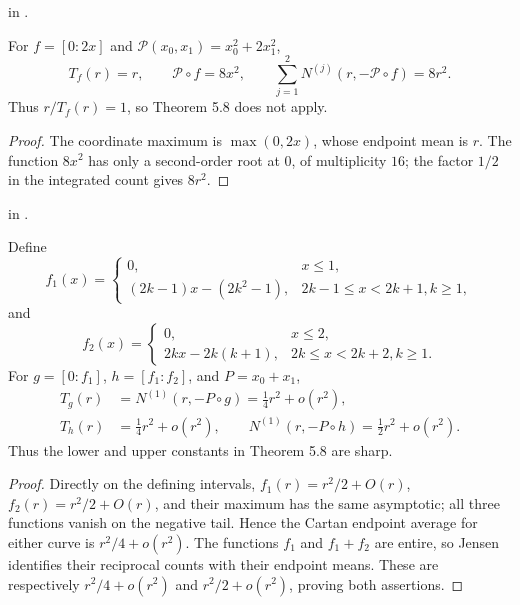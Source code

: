 \begin{leanproof}
 in .
\end{leanproof}

\begin{example}
\leanok
{}
For $f=[0:2x]$ and $\mathcal P(x_0,x_1)=x_0^2+2x_1^2$,
\[
 T_f(r)=r,\qquad \mathcal P\circ f=8x^2,\qquad
 \sum_{j=1}^2N^{(j)}(r,-\mathcal P\circ f)=8r^2.
\]
Thus $r/T_f(r)=1$, so Theorem 5.8 does not apply.
\end{example}

\begin{proof}
\leanok
The coordinate maximum is $\max(0,2x)$, whose endpoint mean is $r$.  The
function $8x^2$ has only a second-order root at $0$, of multiplicity $16$;
the factor $1/2$ in the integrated count gives $8r^2$.
\end{proof}

\begin{leanproof}
 in
.
\end{leanproof}

\begin{example}
\leanok
{}
Define
\[
 f_1(x)=\begin{cases}0,&x\leq1,\\
 (2k-1)x-(2k^2-1),&2k-1\leq x<2k+1, k\geq1,
 \end{cases}
\]
and
\[
 f_2(x)=\begin{cases}0,&x\leq2,\\
 2kx-2k(k+1),&2k\leq x<2k+2, k\geq1.
 \end{cases}
\]
For $g=[0:f_1]$, $h=[f_1:f_2]$, and $P=x_0+x_1$,
\begin{align*}
 T_g(r)&=N^{(1)}(r,-P\circ g)=\frac14r^2+o(r^2),\\
 T_h(r)&=\frac14r^2+o(r^2),\qquad
 N^{(1)}(r,-P\circ h)=\frac12r^2+o(r^2).
\end{align*}
Thus the lower and upper constants in Theorem 5.8 are sharp.
\end{example}

\begin{proof}
\leanok
Directly on the defining intervals,
$f_1(r)=r^2/2+O(r)$, $f_2(r)=r^2/2+O(r)$, and their maximum has the same
asymptotic; all three functions vanish on the negative tail.  Hence the
Cartan endpoint average for either curve is $r^2/4+o(r^2)$.  The functions
$f_1$ and $f_1+f_2$ are entire, so Jensen identifies their reciprocal counts
with their endpoint means.  These are respectively $r^2/4+o(r^2)$ and
$r^2/2+o(r^2)$, proving both assertions.
\end{proof}

